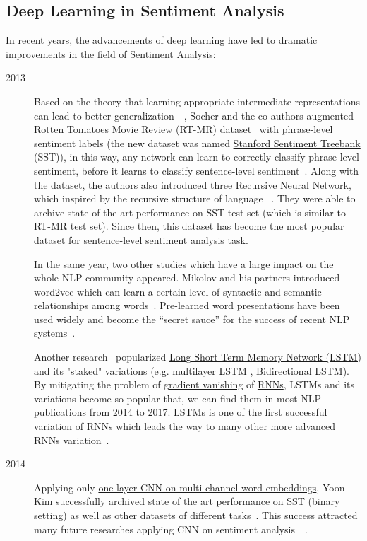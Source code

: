 \subsection{Deep Learning in Sentiment Analysis}
In recent years, the advancements of deep learning have led to dramatic improvements in the field of Sentiment Analysis:
\begin{description}
\item [2013] Based on the theory that learning appropriate intermediate representations can lead to better generalization~\cite{knowledge-matter}~\cite{tran-auto-encoder}, Socher and the co-authors augmented Rotten Tomatoes Movie Review  (RT-MR) dataset~\cite{Rotten-Tomato} with phrase-level sentiment labels (the new dataset was named \hyperref[sec:sst]{Stanford Sentiment Treebank} (SST)), in this way, any network can learn to correctly classify phrase-level sentiment, before it learns to classify sentence-level sentiment~\cite{socher2013recursive}. Along with the dataset, the authors also introduced three Recursive Neural Network, which inspired by the recursive structure of language ~\cite{socher2013recursive}.
They were able to archive state of the art performance on SST test set (which is similar to RT-MR test set).
Since then, this dataset has become the most popular dataset for sentence-level sentiment analysis task.

In the same year, two other studies which have a large impact on the whole NLP community appeared.
Mikolov and his partners introduced word2vec which can learn a certain level of syntactic and semantic relationships among words~\cite{word2vec}.
Pre-learned word presentations have been used widely and become the “secret sauce” for the success of recent NLP systems~\cite{Luong_betterword}.

Another research~\cite{GravesLSTM} popularized \hyperref[sec:lstm]{Long Short Term Memory Network (LSTM)} and its "staked" variations (e.g. \hyperref[sec:multilayer-lstm]{multilayer LSTM} , \hyperref[sec:bilstm]{Bidirectional LSTM}).
By mitigating the problem of \hyperref[sec:gradient-vanish]{gradient vanishing} of \hyperref[sec:RNN]{RNNs}, LSTMs and its variations become so popular that, we can find them in most NLP publications from 2014 to 2017.
LSTMs is one of the first successful variation of RNNs which leads the way to many other more advanced RNNs variation~\cite{olah2016attention}.

\item [2014] Applying only \hyperref[kim-cnn]{one layer CNN on multi-channel word embeddings}, Yoon Kim successfully archived state of the art performance on \hyperref[sec:sst]{SST (binary setting)} as well as other datasets of different tasks~\cite{KimCNN}.
This success attracted many future researches applying CNN on sentiment analysis~\cite{2-layer-cnn}~\cite{cnn-rnn}.


\end{description}
